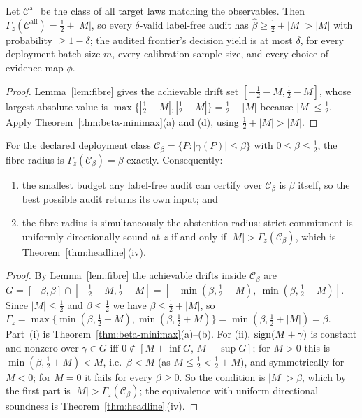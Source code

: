 \begin{corollary}\label{cor:audA}\label{thm:aud-A}\label{thm:short-audA}
Let $\mathcal C^{\mathrm{all}}$ be the class of all target laws matching the observables.
Then $\Gamma_z(\mathcal C^{\mathrm{all}})=\tfrac12+|M|$, so every $\delta$-valid label-free
audit has $\widehat\beta\ge\tfrac12+|M|>|M|$ with probability $\ge1-\delta$; the audited
frontier's decision yield is at most $\delta$, for every deployment batch size $m$, every
calibration sample size, and every choice of evidence map $\phi$.
\end{corollary}
\begin{proof}
Lemma~\ref{lem:fibre} gives the achievable drift set
$[-\tfrac12-M,\tfrac12-M]$, whose largest absolute value is
$\max\{|\tfrac12-M|,|\tfrac12+M|\}=\tfrac12+|M|$ because $|M|\le\tfrac12$. Apply
Theorem~\ref{thm:beta-minimax}(a) and (d), using $\tfrac12+|M|>|M|$.
\end{proof}

\begin{corollary}\label{cor:beta-is-beta}
For the declared deployment class $\mathcal C_\beta=\{P:|\gamma(P)|\le\beta\}$ with
$0\le\beta\le\tfrac12$, the fibre radius is $\Gamma_z(\mathcal C_\beta)=\beta$ exactly.
Consequently:
\begin{enumerate}
\item[\textnormal{(i)}] the smallest budget any label-free audit can certify over
$\mathcal C_\beta$ is $\beta$ itself, so the best possible audit returns its own input; and
\item[\textnormal{(ii)}] the fibre radius is simultaneously the abstention radius: strict
commitment is uniformly directionally sound at $z$ if and only if
$|M|>\Gamma_z(\mathcal C_\beta)$, which is Theorem~\ref{thm:headline}\,(iv).
\end{enumerate}
\end{corollary}
\begin{proof}
By Lemma~\ref{lem:fibre} the achievable drifts inside $\mathcal C_\beta$ are
$G=[-\beta,\beta]\cap[-\tfrac12-M,\tfrac12-M]
=[-\min(\beta,\tfrac12+M),\ \min(\beta,\tfrac12-M)]$. Since $|M|\le\tfrac12$ and
$\beta\le\tfrac12$ we have $\beta\le\tfrac12+|M|$, so
$\Gamma_z=\max\{\min(\beta,\tfrac12-M),\min(\beta,\tfrac12+M)\}=\min(\beta,\tfrac12+|M|)=\beta$.
Part~(i) is Theorem~\ref{thm:beta-minimax}(a)--(b). For (ii), $\operatorname{sign}(M+\gamma)$ is constant
and nonzero over $\gamma\in G$ iff $0\notin[M+\inf G,\,M+\sup G]$; for $M>0$ this is
$\min(\beta,\tfrac12+M)<M$, i.e.\ $\beta<M$ (as $M\le\tfrac12<\tfrac12+M$), and symmetrically
for $M<0$; for $M=0$ it fails for every $\beta\ge0$. So the condition is $|M|>\beta$, which by
the first part is $|M|>\Gamma_z(\mathcal C_\beta)$; the equivalence with uniform directional
soundness is Theorem~\ref{thm:headline}\,(iv).
\end{proof}

